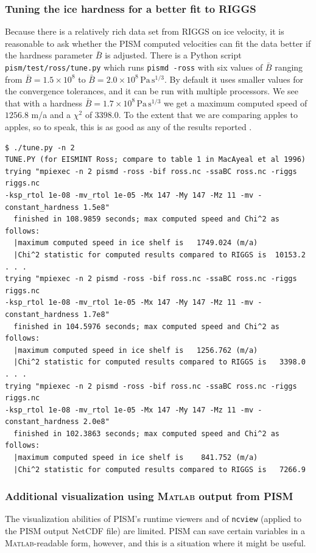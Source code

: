 \documentclass[11pt,final]{amsart}
\newcommand{\Matlab}{\textsc{Matlab}\xspace}
\begin{document}
\subsubsection*{Tuning the ice hardness for a better fit to RIGGS}  Because there is a relatively rich data set from RIGGS on ice velocity, it is reasonable to ask whether the PISM computed velocities can fit the data better if the hardness parameter $\bar B$ is adjusted.  There is a Python script \verb|pism/test/ross/tune.py| which runs \verb|pismd -ross| with six values of $\bar B$ ranging from $\bar B = 1.5  \times 10^8$ to $\bar B = 2.0 \times 10^8 \, \text{Pa}\, \text{s}^{1/3}$.  By default it uses smaller values for the convergence tolerances, and it can be run with multiple processors.  We see that with a hardness $\bar B = 1.7 \times 10^8 \, \text{Pa}\, \text{s}^{1/3}$ we get a maximum computed speed of $1256.8$ m/a and a $\chi^2$ of $3398.0$.  To the extent that we are comparing apples to apples, so to speak, this is as good as any of the results reported \cite{MacAyealetal}.

\small\begin{verbatim}
$ ./tune.py -n 2
TUNE.PY (for EISMINT Ross; compare to table 1 in MacAyeal et al 1996)
trying "mpiexec -n 2 pismd -ross -bif ross.nc -ssaBC ross.nc -riggs riggs.nc 
-ksp_rtol 1e-08 -mv_rtol 1e-05 -Mx 147 -My 147 -Mz 11 -mv -constant_hardness 1.5e8"
  finished in 108.9859 seconds; max computed speed and Chi^2 as follows:
  |maximum computed speed in ice shelf is   1749.024 (m/a)
  |Chi^2 statistic for computed results compared to RIGGS is  10153.2
. . .
trying "mpiexec -n 2 pismd -ross -bif ross.nc -ssaBC ross.nc -riggs riggs.nc 
-ksp_rtol 1e-08 -mv_rtol 1e-05 -Mx 147 -My 147 -Mz 11 -mv -constant_hardness 1.7e8"
  finished in 104.5976 seconds; max computed speed and Chi^2 as follows:
  |maximum computed speed in ice shelf is   1256.762 (m/a)
  |Chi^2 statistic for computed results compared to RIGGS is   3398.0
. . .
trying "mpiexec -n 2 pismd -ross -bif ross.nc -ssaBC ross.nc -riggs riggs.nc 
-ksp_rtol 1e-08 -mv_rtol 1e-05 -Mx 147 -My 147 -Mz 11 -mv -constant_hardness 2.0e8"
  finished in 102.3863 seconds; max computed speed and Chi^2 as follows:
  |maximum computed speed in ice shelf is    841.752 (m/a)
  |Chi^2 statistic for computed results compared to RIGGS is   7266.9
\end{verbatim}
\normalsize

\subsubsection*{Additional visualization using \Matlab output from PISM}  The visualization abilities of PISM's runtime viewers and of \verb|ncview| (applied to the PISM output NetCDF file) are limited.  PISM can save certain variables in a \Matlab-readable form, however, and this is a situation where it might be useful.
\end{document}
